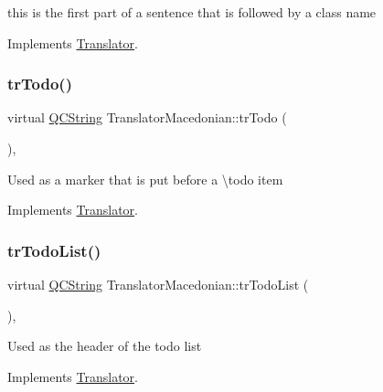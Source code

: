 this is the first part of a sentence that is followed by a class name 

Implements \mbox{\hyperlink{class_translator}{Translator}}.

\mbox{\label{class_translator_macedonian_aecee3b5593ea4719a6371b6322ec0538}} 
\subsubsection{\texorpdfstring{trTodo()}{trTodo()}}
{\footnotesize\ttfamily virtual \mbox{\hyperlink{class_q_c_string}{Q\+C\+String}} Translator\+Macedonian\+::tr\+Todo (\begin{DoxyParamCaption}{ }\end{DoxyParamCaption})\hspace{0.3cm}{\ttfamily [inline]}, {\ttfamily [virtual]}}

Used as a marker that is put before a \textbackslash{}todo item 

Implements \mbox{\hyperlink{class_translator}{Translator}}.

\mbox{\label{class_translator_macedonian_a3fdc51e7aac8f2ab7d2ee61c8bd99cee}} 
\subsubsection{\texorpdfstring{trTodoList()}{trTodoList()}}
{\footnotesize\ttfamily virtual \mbox{\hyperlink{class_q_c_string}{Q\+C\+String}} Translator\+Macedonian\+::tr\+Todo\+List (\begin{DoxyParamCaption}{ }\end{DoxyParamCaption})\hspace{0.3cm}{\ttfamily [inline]}, {\ttfamily [virtual]}}

Used as the header of the todo list 

Implements \mbox{\hyperlink{class_translator}{Translator}}.

\mbox{\label{class_translator_macedonian_af2309784cdb6562af2f328a5d9b7f76f}} 
